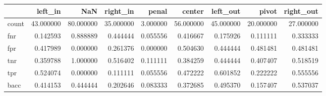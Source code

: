 \begin{tabular}{lrrrrrrrr}
\toprule
{} &    left\_in &        NaN &   right\_in &     penal &     center &   left\_out &      pivot &  right\_out \\
\midrule
count &  43.000000 &  80.000000 &  35.000000 &  3.000000 &  56.000000 &  45.000000 &  20.000000 &  27.000000 \\
fnr   &   0.142593 &   0.888889 &   0.444444 &  0.055556 &   0.416667 &   0.175926 &   0.111111 &   0.333333 \\
fpr   &   0.417989 &   0.000000 &   0.261376 &  0.000000 &   0.504630 &   0.444444 &   0.481481 &   0.481481 \\
tnr   &   0.359788 &   1.000000 &   0.516402 &  0.111111 &   0.384259 &   0.444444 &   0.407407 &   0.518519 \\
tpr   &   0.524074 &   0.000000 &   0.111111 &  0.055556 &   0.472222 &   0.601852 &   0.222222 &   0.555556 \\
bacc  &   0.414153 &   0.444444 &   0.202646 &  0.083333 &   0.372685 &   0.495370 &   0.157407 &   0.537037 \\
\bottomrule
\end{tabular}
